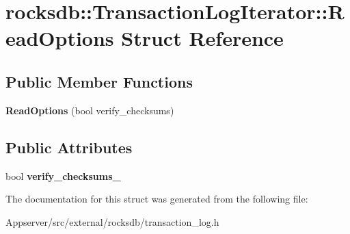 \hypertarget{structrocksdb_1_1TransactionLogIterator_1_1ReadOptions}{}\section{rocksdb\+:\+:Transaction\+Log\+Iterator\+:\+:Read\+Options Struct Reference}
\label{structrocksdb_1_1TransactionLogIterator_1_1ReadOptions}
\subsection*{Public Member Functions}
\begin{DoxyCompactItemize}
\item 
{\bfseries Read\+Options} (bool verify\+\_\+checksums)\hypertarget{structrocksdb_1_1TransactionLogIterator_1_1ReadOptions_a21d630f1ec2743b6e2eb11d23a29be9b}{}\label{structrocksdb_1_1TransactionLogIterator_1_1ReadOptions_a21d630f1ec2743b6e2eb11d23a29be9b}

\end{DoxyCompactItemize}
\subsection*{Public Attributes}
\begin{DoxyCompactItemize}
\item 
bool {\bfseries verify\+\_\+checksums\+\_\+}\hypertarget{structrocksdb_1_1TransactionLogIterator_1_1ReadOptions_ac54467282bf7138a52cc0a39ee302987}{}\label{structrocksdb_1_1TransactionLogIterator_1_1ReadOptions_ac54467282bf7138a52cc0a39ee302987}

\end{DoxyCompactItemize}


The documentation for this struct was generated from the following file\+:\begin{DoxyCompactItemize}
\item 
Appserver/src/external/rocksdb/transaction\+\_\+log.\+h\end{DoxyCompactItemize}
